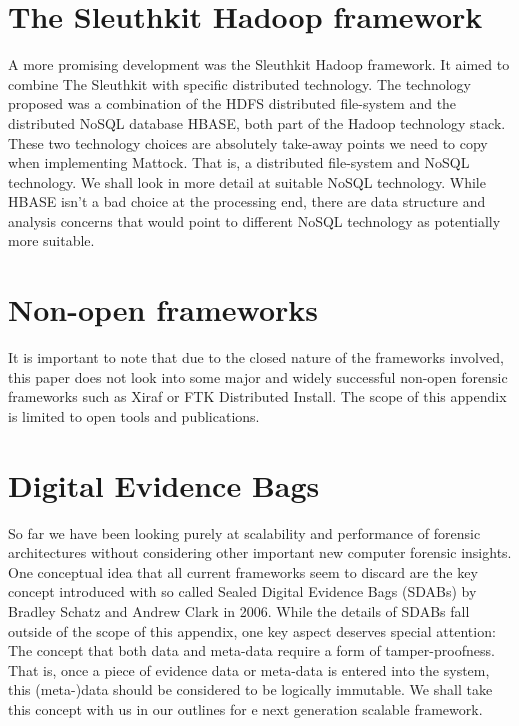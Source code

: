 \section{The Sleuthkit Hadoop framework}
A more promising development was the Sleuthkit Hadoop framework. It aimed to combine The Sleuthkit with specific distributed technology. The technology proposed was a combination of the HDFS distributed file-system and the distributed NoSQL database HBASE, both part of the Hadoop technology stack. These two technology choices are absolutely take-away points we need to copy when implementing Mattock. That is, a distributed file-system and NoSQL technology. We shall look in more detail at suitable NoSQL technology. While HBASE isn't a bad choice at the processing end, there are data structure and analysis concerns that would point to different NoSQL technology as potentially more suitable. 
\section{Non-open frameworks}
It is important to note that due to the closed nature of the frameworks involved, this paper does not look into some major and widely successful non-open forensic frameworks such as Xiraf or FTK Distributed Install. The scope of this appendix is limited to open tools and publications.
\section{Digital Evidence Bags}
So far we have been looking purely at scalability and performance of forensic architectures without considering other important new computer forensic insights. One conceptual idea that all current frameworks seem to discard are the key concept introduced with so called Sealed Digital Evidence Bags (SDABs) by Bradley Schatz and Andrew Clark in 2006. While the details of SDABs fall outside of the scope of this appendix, one key aspect deserves special attention: The concept that both data and meta-data require a form of tamper-proofness. That is, once a piece of evidence data or meta-data is entered into the system, this (meta-)data should be considered to be logically immutable. We shall take this concept with us in our outlines for e next generation scalable framework.
